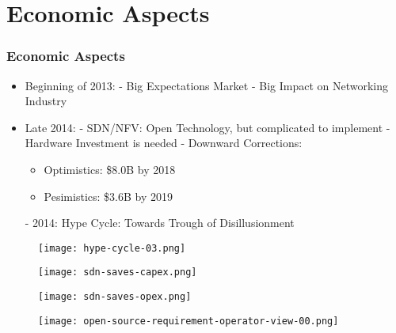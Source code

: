 \section{Economic Aspects}

\begin{frame}[allowframebreaks]
\frametitle{Economic Aspects}

\begin{itemize}
 \item Beginning of 2013:\linebreak
	- Big Expectations Market\linebreak
 - Big Impact on Networking Industry
 \item Late 2014:\linebreak
	- SDN/NFV: Open Technology, but complicated to implement\linebreak
	- Hardware Investment is needed\linebreak
	- Downward Corrections:
   \begin{itemize}
   \item Optimistics: \$8.0B by 2018
   \item Pesimistics: \$3.6B by 2019
   \end{itemize}
	- 2014: Hype Cycle: Towards Trough of Disillusionment
\end{itemize}

\begin{center}
  \begin{figure}
    \texttt{[image: hype-cycle-03.png]}
  \end{figure}
\end{center}

\begin{center}
  \begin{figure}
    \texttt{[image: sdn-saves-capex.png]}
  \end{figure}
\end{center}

\begin{center}
  \begin{figure}
    \texttt{[image: sdn-saves-opex.png]}
  \end{figure}
\end{center}

\begin{center}
  \begin{figure}
    \texttt{[image: open-source-requirement-operator-view-00.png]}
  \end{figure}
\end{center}

\end{frame}
